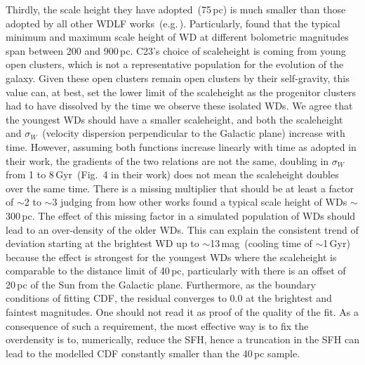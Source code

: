 \documentclass[fleqn,usenatbib]{mnras}
\begin{document}
Thirdly, the scale height they have adopted~(75\,pc) is much smaller than those
adopted by all other WDLF works~(e.g.\,\citealt{2006AJ....131..571H,
2011MNRAS.417...93R, 2019MNRAS.482..715L}). Particularly,
\citet{2006AJ....131..571H} found that the typical minimum and maximum scale
height of WD at different bolometric magnitudes span between 200 and 900\,pc.
C23's choice of scaleheight is coming from young open clusters, which is not
a representative population for the evolution of the galaxy. Given these open
clusters remain open clusters by their self-gravity, this value can, at best,
set the lower limit of the scaleheight as the progenitor clusters had to have
dissolved by the time we observe these isolated WDs. We agree that the youngest
WDs should have a smaller scaleheight, and both the scaleheight and
$\sigma_W$~(velocity dispersion perpendicular to the Galactic plane) increase
with time. However, assuming both functions increase linearly with time as
adopted in their work, the gradients of the two relations are not the same,
doubling in $\sigma_W$ from 1 to 8\,Gyr~(Fig.~4 in their work) does not mean
the scaleheight doubles over the same time. There is a missing multiplier
that should be at least a factor of $\sim$2 to $\sim$3 judging from how other 
works found a typical scale height of WDs $\sim$300\,pc. The effect of this 
missing factor in a simulated population of WDs should lead to an over-density
of the older WDs. This can explain the consistent trend of deviation starting
at the brightest WD up to $\sim$13\,mag~(cooling time of $\sim$1\,Gyr) because
the effect is strongest for the youngest WDs where the scaleheight is
comparable to the distance limit of 40\,pc, particularly with there is an
offset of 20\,pc of the Sun from the Galactic plane. Furthermore, as the
boundary conditions of fitting CDF, the residual converges to 0.0 at the
brightest and faintest magnitudes. One should not read it as proof of the
quality of the fit. As a consequence of such a requirement, the most effective
way is to fix the overdensity is to, numerically, reduce the SFH, hence a
truncation in the SFH can lead to the modelled CDF constantly smaller than the
40\,pc sample.

\end{document}
